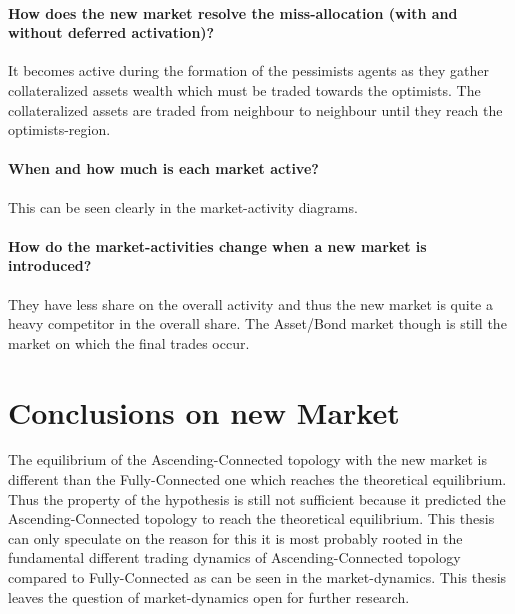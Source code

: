 \documentclass[Bachelorarbeit.tex]{subfiles}
\begin{document}
\paragraph{How does the new market resolve the miss-allocation (with and without deferred activation)?}
It becomes active during the formation of the pessimists agents as they gather collateralized assets wealth which must be traded towards the optimists. The collateralized assets are traded from neighbour to neighbour until they reach the optimists-region.

\paragraph{When and how much is each market active?}
This can be seen clearly in the market-activity diagrams.

\paragraph{How do the market-activities change when a new market is introduced?}
They have less share on the overall activity and thus the new market is quite a heavy competitor in the overall share. The Asset/Bond market though is still the market on which the final trades occur.

\section{Conclusions on new Market}
The equilibrium of the Ascending-Connected topology with the new market is different than the Fully-Connected one which reaches the theoretical equilibrium. Thus the property of the hypothesis is still not sufficient because it predicted the Ascending-Connected topology to reach the theoretical equilibrium. This thesis can only speculate on the reason for this it is most probably rooted in the fundamental different trading dynamics of Ascending-Connected topology compared to Fully-Connected as can be seen in the market-dynamics. This thesis leaves the question of market-dynamics open for further research.
\end{document}
